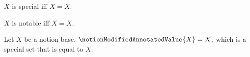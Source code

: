 

\begin{definition}\label{notion_special_set}
    $X$ is special iff $X=X$.
\end{definition}

\begin{definition}\label{notion_notable_set}
    $X$ is notable iff $X=X$.
\end{definition}

\begin{definition}\label{notion_modified_annotated_value}
    Let $X$ be a notion base.
    $\notionModifiedAnnotatedValue{X}=X$, which is a special set
        that is equal to $X$.
\end{definition}
